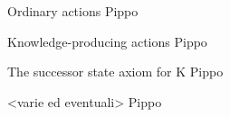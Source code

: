 \begin{frame}{Ordinary actions}
    Pippo
\end{frame}

\begin{frame}{Knowledge-producing actions}
    Pippo
\end{frame}

\begin{frame}{The successor state axiom for K}
    Pippo
\end{frame}

\begin{frame}{<varie ed eventuali>}
    Pippo
\end{frame}
